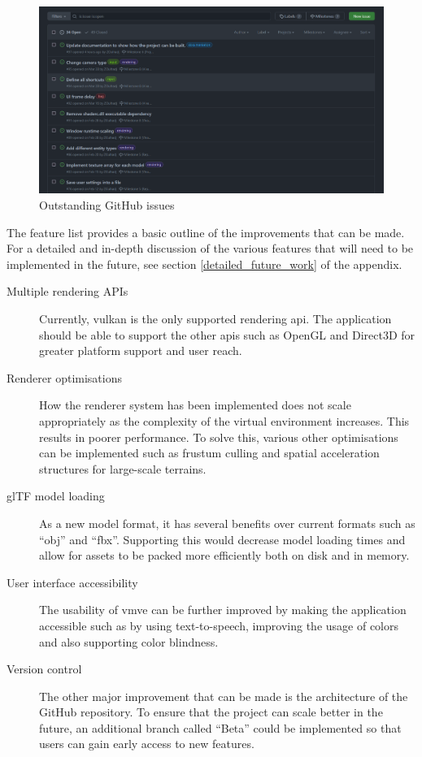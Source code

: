 \documentclass[11pt]{article}
\begin{document}
\begin{figure}[H]
  \centering
  \includegraphics[width=\textwidth]{images/github_issues.png}
  \caption{Outstanding GitHub issues}
  \label{fig:github_issues}
\end{figure}

The feature list provides a basic outline of the improvements that can be made.
For a detailed and in-depth discussion of the various features that will need to
be implemented in the future, see section \ref{detailed_future_work} of the
appendix.
\begin{description}
  \item[Multiple rendering APIs] Currently, \gls*{vulkan} is the only supported
    rendering \gls*{api}. The application should be able to support the other
    \glspl*{api} such as OpenGL and Direct3D for greater platform support and
    user reach.
  \item[Renderer optimisations] How the renderer system has been implemented
    does not scale appropriately as the complexity of the virtual environment
    increases. This results in poorer performance. To solve this, various other
    optimisations can be implemented such as frustum culling and spatial
    acceleration structures for large-scale terrains.
  \item[glTF model loading] As a new model format, it has several benefits over
    current formats such as ``obj'' and ``fbx''. Supporting this would decrease
    model loading times and allow for assets to be packed more efficiently both
    on disk and in memory.
  \item[User interface accessibility]
    The usability of \gls*{vmve} can be further improved by making the
    application accessible such as by using text-to-speech, improving the usage
    of colors and also supporting color blindness.
  \item[Version control] The other major improvement that can be made is the
    architecture of the GitHub repository. To ensure that the project can scale
    better in the future, an additional branch called ``Beta'' could be
    implemented so that users can gain early access to new features.
  
\end{description}
\end{document}
